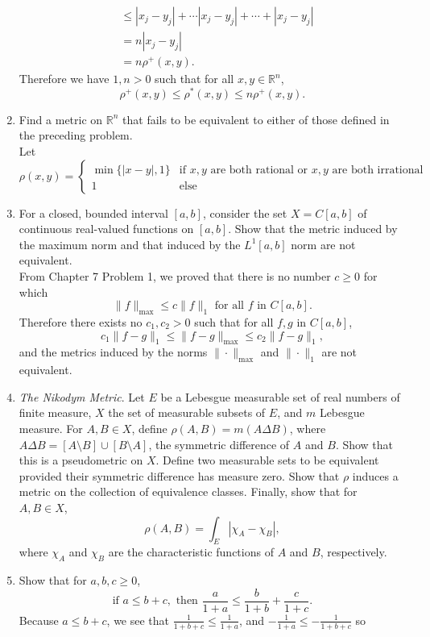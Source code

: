 \begin{enumerate}
\begin{align*}
        &\le |x_j-y_j| + \cdots|x_j-y_j|+\cdots + |x_j-y_j|\\
        &= n|x_j-y_j|\\
        &=n\rho^+(x,y).
    \end{align*}
    Therefore we have $1,n>0$ such that for all $x,y\in \mathbb{R}^n$,
    \[
        \rho^+(x,y)\le\rho^*(x,y)\le n\rho^+(x,y).
    \]
    \item Find a metric on $\mathbb{R}^n$ that fails to be equivalent to either of those defined in the preceding problem.\\
    Let 
    \[
    \rho(x,y)=
    \begin{cases}
        \min\{|x-y|,1\}&\text{if $x,y$ are both rational or $x,y$ are both irrational}\\
        1&\text{else}
    \end{cases}    
    \]
    \item For a closed, bounded interval $[a,b]$, consider the set $X=C[a,b]$ of continuous real-valued functions on $[a,b]$.
    Show that the metric induced by the maximum norm and that induced by the $L^1[a,b]$ norm are not equivalent.\\
    From Chapter 7 Problem 1, we proved that there is no number $c \ge 0$ for which
	\[
	\| f \|_{\max}	\le c \| f \|_1 \text{ for all $f$ in $C[a,b]$}.
	\]
    Therefore there exists no $c_1,c_2>0$ such that for all $f,g$ in $C[a,b]$,
    \[
        c_1\| f-g \|_1 \le \| f-g \|_{\max}	\le c_2 \| f-g \|_1,
	\]
    and the metrics induced by the norms $\| \cdot \|_{\max}$ and $\| \cdot \|_1$ are not equivalent.
    \item \textit{The Nikodym Metric}. Let $E$ be a Lebesgue measurable set of real numbers of finite measure, $X$ the set of measurable subsets of $E$, and $m$ Lebesgue measure.
    For $A,B\in X$, define $\rho(A,B)=m(A\Delta B)$, where $A\Delta B = [A\setminus B]\cup[B\setminus A]$, the symmetric difference of $A$ and $B$.
    Show that this is a pseudometric on $X$.
    Define two measurable sets to be equivalent provided their symmetric difference has measure zero.
    Show that $\rho$ induces a metric on the collection of equivalence classes.
    Finally, show that for $A,B\in X$, 
    \[
    \rho(A,B)=\int_E|\chi_A-\chi_B|,    
    \]
    where $\chi_A$ and $\chi_B$ are the characteristic functions of $A$ and $B$, respectively.
    \item Show that for $a,b,c\ge0$,
    \[
    \text{if }a\le b+c,\text{ then }\frac{a}{1+a}\le\frac{b}{1+b}+\frac{c}{1+c}.
    \]
    Because $a\le b+c$, we see that $\frac{1}{1+b+c}\le\frac{1}{1+a}$, and $-\frac{1}{1+a}\le-\frac{1}{1+b+c}$ so

\end{enumerate}
